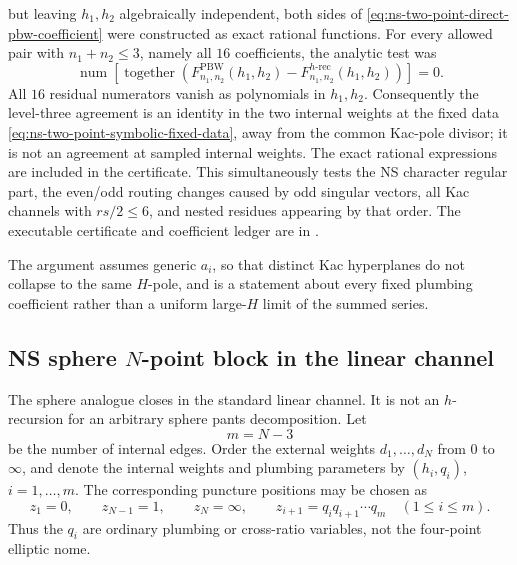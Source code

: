 \documentclass[11pt]{article}
\begin{document}
but leaving \(h_1,h_2\) algebraically independent, both sides of
\eqref{eq:ns-two-point-direct-pbw-coefficient} were constructed as exact
rational functions.  For every allowed pair with \(n_1+n_2\leq3\), namely
all \(16\) coefficients, the analytic test was
\begin{equation}
 \operatorname{num}\!\left[
  \operatorname{together}\!\left(
   F^{\mathrm{PBW}}_{n_1,n_2}(h_1,h_2)
   -F^{h\text{-}\mathrm{rec}}_{n_1,n_2}(h_1,h_2)
  \right)
 \right]=0.
 \label{eq:ns-two-point-symbolic-level-three-check}
\end{equation}
All \(16\) residual numerators vanish as polynomials in \(h_1,h_2\).
Consequently the level-three agreement is an identity in the two internal
weights at the fixed data \eqref{eq:ns-two-point-symbolic-fixed-data}, away
from the common Kac-pole divisor; it is not an agreement at sampled internal
weights.  The exact rational expressions are included in the certificate.
This simultaneously tests the NS character regular part, the even/odd
routing changes caused by odd singular vectors, all Kac channels with
\(rs/2\leq6\), and nested residues appearing by that order.  The executable
certificate and coefficient ledger are in
.

The argument assumes generic \(a_i\), so that distinct Kac hyperplanes do
not collapse to the same \(H\)-pole, and is a statement about every fixed
plumbing coefficient rather than a uniform large-\(H\) limit of the summed
series.

\subsection{\texorpdfstring{NS sphere \(N\)-point block in the linear channel}
{NS sphere N-point block in the linear channel}}
\label{sec:ns-sphere-linear-h-recursion}

The sphere analogue closes in the standard linear channel.  It is not an
\(h\)-recursion for an arbitrary sphere pants decomposition.  Let
\begin{equation}
 m=N-3
\end{equation}
be the number of internal edges.  Order the external weights
\(d_1,\ldots,d_N\) from \(0\) to \(\infty\), and denote the internal weights
and plumbing parameters by
\((h_i,q_i)\), \(i=1,\ldots,m\).  The corresponding puncture positions may
be chosen as
\begin{equation}
 z_1=0,\qquad z_{N-1}=1,\qquad z_N=\infty,\qquad
 z_{i+1}=q_iq_{i+1}\cdots q_m
 \quad(1\leq i\leq m).
 \label{eq:ns-sphere-linear-coordinates}
\end{equation}
Thus the \(q_i\) are ordinary plumbing or cross-ratio variables, not the
four-point elliptic nome.
\end{document}
